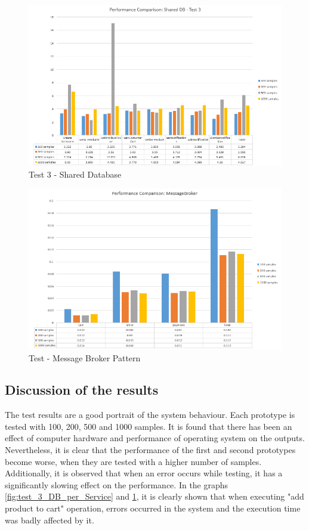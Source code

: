 \documentclass{article}
\begin{document}
\pagebreak

\begin{figure}[h!]
\centering
\includegraphics[scale=0.55]{Test_Results/test_3_shared_DB.PNG}
\caption{Test 3 - Shared Database}
\label{fig:test_3_shared_DB}
\end{figure}

\begin{figure}[h!]
\centering
\includegraphics[scale=0.65]{Test_Results/test_MessageBroker.PNG}
\caption{Test - Message Broker Pattern}
\label{fig:test_MessageBroker}
\end{figure}

\pagebreak

\subsection{Discussion of the results}
The test results are a good portrait of the system behaviour. Each prototype is tested with 100, 200, 500 and 1000 samples. It is found that there has been an effect of computer hardware and performance of operating system on the outputs. Nevertheless, it is clear that the performance of the first and second prototypes become worse, when they are tested with a higher number of samples. Additionally, it is observed that when an error occurs while testing, it has a significantly slowing effect on the performance. In the graphs \ref{fig:test_3_DB_per_Service} and \ref{fig:test_3_shared_DB}, it is clearly shown that when executing "add product to cart" operation, errors occurred in the system and the execution time was badly affected by it.
\bigbreak
\end{document}
